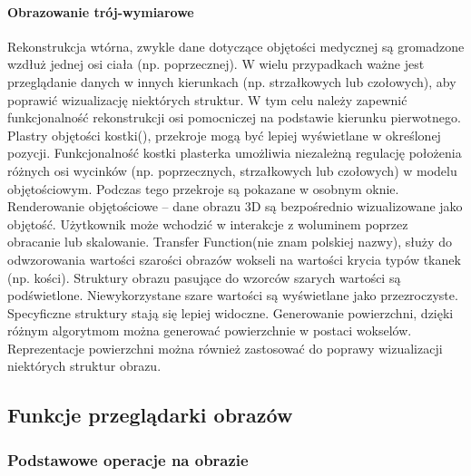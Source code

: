 \paragraph{Obrazowanie trój-wymiarowe}

Rekonstrukcja wtórna, zwykle dane dotyczące objętości medycznej są gromadzone wzdłuż jednej osi ciała (np. poprzecznej).
W wielu przypadkach ważne jest przeglądanie danych w innych kierunkach (np. strzałkowych lub czołowych), aby poprawić wizualizację niektórych struktur.
W tym celu należy zapewnić funkcjonalność rekonstrukcji osi pomocniczej na podstawie kierunku pierwotnego.
Plastry objętości kostki(), przekroje mogą być lepiej wyświetlane w określonej pozycji.
Funkcjonalność kostki plasterka umożliwia niezależną regulację położenia różnych osi wycinków (np. poprzecznych, strzałkowych lub czołowych) w modelu objętościowym.
Podczas tego przekroje są pokazane w osobnym oknie.
Renderowanie objętościowe – dane obrazu 3D są bezpośrednio wizualizowane jako objętość.
Użytkownik może wchodzić w interakcje z woluminem poprzez obracanie lub skalowanie.
Transfer Function(nie znam polskiej nazwy), służy do odwzorowania wartości szarości obrazów wokseli na wartości krycia typów tkanek (np. kości). Struktury obrazu pasujące do wzorców szarych wartości są podświetlone. Niewykorzystane szare wartości są wyświetlane jako
przezroczyste. Specyficzne struktury stają się lepiej widoczne.
Generowanie powierzchni, dzięki różnym algorytmom można generować powierzchnie w postaci wokselów. Reprezentacje powierzchni można również zastosować do poprawy wizualizacji niektórych struktur obrazu.

\subsection{Funkcje przeglądarki obrazów}

\subsubsection{Podstawowe operacje na obrazie}

